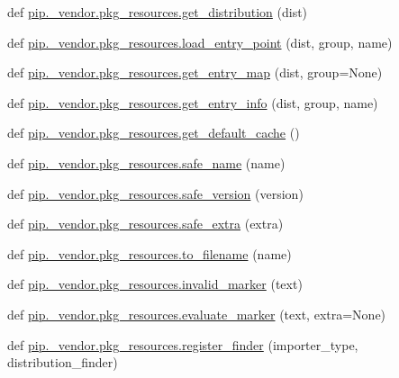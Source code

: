 \begin{DoxyCompactItemize}
\item 
def \hyperlink{namespacepip_1_1__vendor_1_1pkg__resources_a66b83328f396096391076c94d6d4cf89}{pip.\+\_\+vendor.\+pkg\+\_\+resources.\+get\+\_\+distribution} (dist)
\item 
def \hyperlink{namespacepip_1_1__vendor_1_1pkg__resources_a856488c57c641e3cafc340bc64d981c4}{pip.\+\_\+vendor.\+pkg\+\_\+resources.\+load\+\_\+entry\+\_\+point} (dist, group, name)
\item 
def \hyperlink{namespacepip_1_1__vendor_1_1pkg__resources_acef1f5028e188ccc606596d430d09a08}{pip.\+\_\+vendor.\+pkg\+\_\+resources.\+get\+\_\+entry\+\_\+map} (dist, group=None)
\item 
def \hyperlink{namespacepip_1_1__vendor_1_1pkg__resources_abf954cc52f4f05a1e1e424362061569b}{pip.\+\_\+vendor.\+pkg\+\_\+resources.\+get\+\_\+entry\+\_\+info} (dist, group, name)
\item 
def \hyperlink{namespacepip_1_1__vendor_1_1pkg__resources_a089c598fc768861704677fbf9d3834ca}{pip.\+\_\+vendor.\+pkg\+\_\+resources.\+get\+\_\+default\+\_\+cache} ()
\item 
def \hyperlink{namespacepip_1_1__vendor_1_1pkg__resources_a70f3daf45932e9f787aa6328ef15c4d0}{pip.\+\_\+vendor.\+pkg\+\_\+resources.\+safe\+\_\+name} (name)
\item 
def \hyperlink{namespacepip_1_1__vendor_1_1pkg__resources_a5dd62b1a3d1156091d9f74bdaf18357f}{pip.\+\_\+vendor.\+pkg\+\_\+resources.\+safe\+\_\+version} (version)
\item 
def \hyperlink{namespacepip_1_1__vendor_1_1pkg__resources_a0fca90e72770561adb5c1feb0ebfd60d}{pip.\+\_\+vendor.\+pkg\+\_\+resources.\+safe\+\_\+extra} (extra)
\item 
def \hyperlink{namespacepip_1_1__vendor_1_1pkg__resources_a8984c165a48e88fd761aded34bc3290e}{pip.\+\_\+vendor.\+pkg\+\_\+resources.\+to\+\_\+filename} (name)
\item 
def \hyperlink{namespacepip_1_1__vendor_1_1pkg__resources_af839e556aca0d802756e520c15420a81}{pip.\+\_\+vendor.\+pkg\+\_\+resources.\+invalid\+\_\+marker} (text)
\item 
def \hyperlink{namespacepip_1_1__vendor_1_1pkg__resources_a8ceda07b502eb64c69b1dd9c1ceaae91}{pip.\+\_\+vendor.\+pkg\+\_\+resources.\+evaluate\+\_\+marker} (text, extra=None)
\item 
def \hyperlink{namespacepip_1_1__vendor_1_1pkg__resources_a01f6ac4d5a90eed912836743a7dedbc8}{pip.\+\_\+vendor.\+pkg\+\_\+resources.\+register\+\_\+finder} (importer\+\_\+type, distribution\+\_\+finder)

\end{DoxyCompactItemize}
